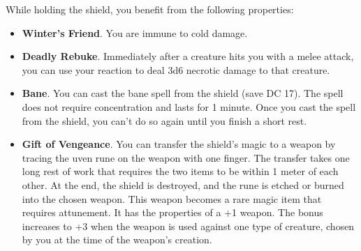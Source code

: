         While holding the shield, you benefit from the following properties:
        \begin{itemize}
            \item \textbf{Winter's Friend}.
            You are immune to cold damage.
            \item \textbf{Deadly Rebuke}.
            Immediately after a creature hits you with a melee attack, you can use your reaction to deal 3d6 necrotic damage to that creature.
            \item \textbf{Bane}.
            You can cast the bane spell from the shield (save DC 17).
            The spell does not require concentration and lasts for 1 minute.
            Once you cast the spell from the shield, you can't do so again until you finish a short rest.
            \item \textbf{Gift of Vengeance}.
            You can transfer the shield's magic to a weapon by tracing the uven rune on the weapon with one finger.
            The transfer takes one long rest of work that requires the two items to be within 1 meter of each other.
            At the end, the shield is destroyed, and the rune is etched or burned into the chosen weapon.
            This weapon becomes a rare magic item that requires attunement.
            It has the properties of a +1 weapon.
            The bonus increases to +3 when the weapon is used against one type of creature, chosen by you at the time of the weapon's creation.
        \end{itemize}
\newpage
